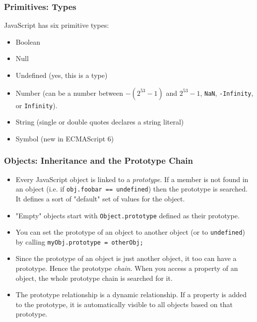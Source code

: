 \documentclass{lug}
\begin{document}
\begin{frame}
    \frametitle{Primitives: Types\footnotemark[1]}

    JavaScript has six primitive types:

    \begin{itemize}
        \item Boolean
        \item Null
        \item Undefined (yes, this is a type)
        \item Number (can be a number between $-(2^{53} - 1)$ and $2^{53} - 1$, \texttt{NaN},
            \texttt{-Infinity}, or \texttt{Infinity}).
        \item String (single or double quotes declares a string literal\footnotemark[2])
        \item Symbol (new in ECMAScript 6)
    \end{itemize}

\end{frame}

\begin{frame}
    \frametitle{Objects: Inheritance and the Prototype Chain}

    \begin{itemize}[<+->]
        \item Every JavaScript object is linked to a \textit{prototype}. If a member is not found in
            an object (i.e. if \texttt{obj.foobar == undefined}) then the prototype is searched. It
            defines a sort of "default" set of values for the object.

        \item "Empty" objects start with \texttt{Object.prototype} defined as their prototype.

        \item You can set the prototype of an object to another object (or to \texttt{undefined}) by
            calling \texttt{myObj.prototype = otherObj;}

        \item Since the prototype of an object is just another object, it too can have a prototype.
            Hence the prototype \textit{chain}. When you access a property of an object, the whole
            prototype chain is searched for it.

        \item The prototype relationship is a dynamic relationship. If a property is added to the
            prototype, it is automatically visible to all objects based on that prototype.
    \end{itemize}

\end{frame}
\end{document}
